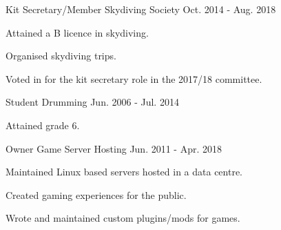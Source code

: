 

\begin{cventries}

  \cventry
    {Kit Secretary/Member} %
    {Skydiving Society} %
    {} %
    {Oct. 2014 - Aug. 2018} %
    {
      \begin{cvmitems} %
        \item {Attained a B licence in skydiving.}
        \item {Organised skydiving trips.}
        \item {Voted in for the kit secretary role in the 2017/18 committee.}
      \end{cvmitems}
    }

  \cventry
    {Student} %
    {Drumming} %
    {} %
    {Jun. 2006 - Jul. 2014} %
    {
      \begin{cvitems} %
        \item {Attained grade 6.}
      \end{cvitems}
    }

  \cventry
    {Owner} %
    {Game Server Hosting} %
    {} %
    {Jun. 2011 - Apr. 2018} %
    {
      \begin{cvmitems} %
        \item {Maintained Linux based servers hosted in a data centre.}
        \item {Created gaming experiences for the public.}
        \item {Wrote and maintained custom plugins/mods for games.}
      \end{cvmitems}
    }

\end{cventries}
